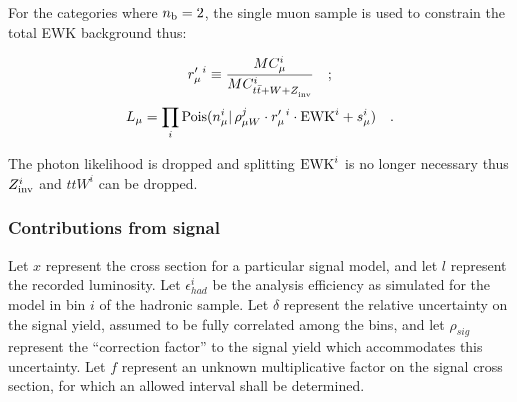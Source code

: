 %
\newcommand{\rpi}{\ensuremath{r_{\mu}^{\prime\ i}}\xspace}

For the categories where $n_{\text{b}}=2$, the single muon sample is used to constrain the
total EWK background thus:

\begin{equation}
\rpi \equiv \frac{MC_{\mu}^i}{MC_{t\bar{t}+W+\zInv{}}^i}\quad ;
\end{equation}
\begin{equation}
\label{eq:muonLikelihoodTotalEwk}
L_{\mu}=\prod_i \mathrm{Pois}(n_{\mu}^i |\, \rho_{\mu W}^j \cdot
\rpi \cdot \ewk^{i} + s_{\mu}^i)\quad .
\end{equation}

The photon likelihood is dropped and splitting $\mathrm{EWK}^i$ is no longer
necessary thus $Z_{\rm inv}^{i}$ and $ttW^{i}$ can be dropped. 

\subsubsection{Contributions from signal}
\label{sec:signalContrib}

Let $x$ represent the cross section for a particular signal model, and
let $l$ represent the recorded luminosity.  Let $\epsilon^{i}_{had}$ 
be the analysis efficiency as simulated for the model in \HT bin $i$ 
of the hadronic sample.  Let $\delta$ represent the relative uncertainty on
the signal yield, assumed to be fully correlated among the bins, and
let $\rho_{sig}$ represent the ``correction factor'' to the signal
yield which accommodates this uncertainty.  Let $f$ represent an
unknown multiplicative factor on the signal cross section, for which
an allowed interval shall be determined.

